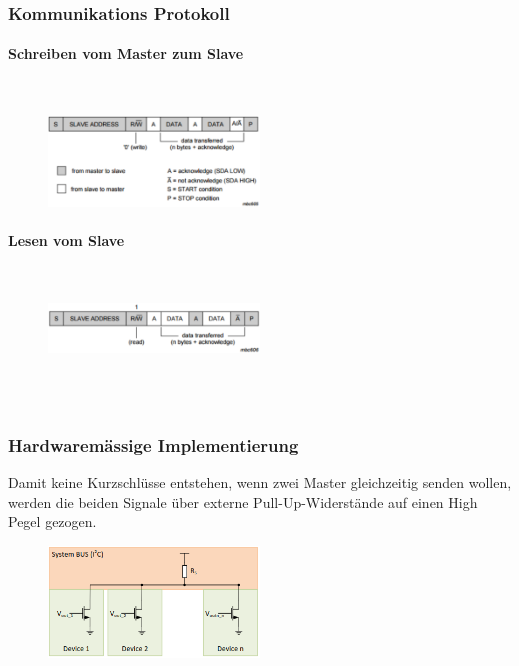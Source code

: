 \begin{multicols}{2}
    \subsubsection{Kommunikations Protokoll}
    \paragraph{Schreiben vom Master zum Slave}$~$
    \begin{figure}[H]
        \includegraphics[width=0.5\textwidth]{images/i2c_protocolWrite.png}
    \end{figure}

    \paragraph{Lesen vom Slave}$~$
    \begin{figure}[H]
        \includegraphics[width=0.5\textwidth]{images/i2c_protocolRead.png}
    \end{figure}

    \ \\ \ \\

    \subsubsection{Hardwaremässige Implementierung}
    Damit keine Kurzschlüsse entstehen, wenn zwei Master gleichzeitig senden wollen, werden die beiden Signale über externe Pull-Up-Widerstände auf einen High Pegel gezogen.
    \begin{figure}[H]
        \includegraphics[width=0.5\textwidth]{images/i2c_hardware.png}
    \end{figure}
\end{multicols}

